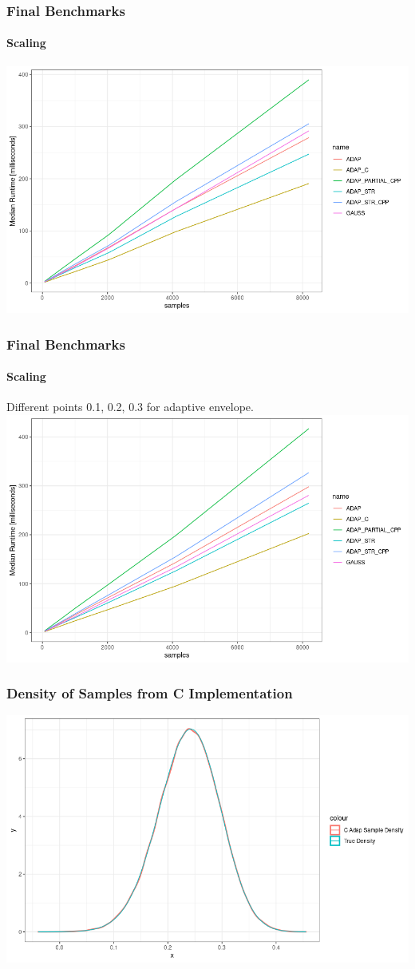 \documentclass[aspectratio=169]{beamer}
\begin{document}
\begin{frame}
  \frametitle{Final Benchmarks}
  \framesubtitle{Scaling}
  \centering
  \includegraphics[scale = 0.5]{figure/MedianRuntime.png}
\end{frame}
\begin{frame}
  \frametitle{Final Benchmarks}
  \framesubtitle{Scaling}
  Different points 0.1, 0.2, 0.3 for adaptive envelope.
  \centering
  \includegraphics[scale = 0.45]{figure/MedianRuntime2.png}
\end{frame}
\begin{frame}
  \frametitle{Density of Samples from C Implementation}
  \centering
  \includegraphics[scale = 0.45]{figure/CAdapDensity.png}
\end{frame}
\end{document}
